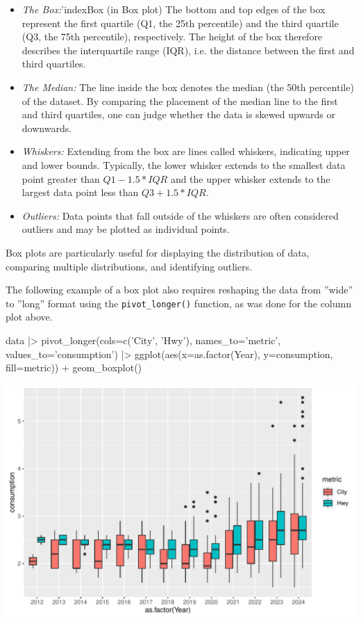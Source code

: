 \begin{itemize}
\item \emph{The Box:}'index{Box (in Box plot)} The bottom and top edges of the box represent the first quartile (Q1, the 25th percentile) and the third quartile (Q3, the 75th percentile), respectively. The height of the box therefore describes the interquartile range (IQR), i.e. the distance between the first and third quartiles.
\item \emph{The Median:} The line inside the box denotes the median (the 50th percentile) of the dataset. By comparing the placement of the median line to the first and third quartiles, one can judge whether the data is skewed upwards or downwards.
\item \emph{Whiskers:} Extending from the box are lines called whiskers, indicating upper and lower bounds. Typically, the lower whisker extends to the smallest data point greater than $Q1 - 1.5 * IQR$ and the upper whisker extends to the largest data point less than $Q3 + 1.5 * IQR$.
\item \emph{Outliers:} Data points that fall outside of the whiskers are often considered outliers and may be plotted as individual points.
\end{itemize}

Box plots are particularly useful for displaying the distribution of data, comparing multiple distributions, and identifying outliers.

The following example of a box plot also requires reshaping the data from ''wide'' to ''long'' format using the \texttt{pivot\_longer()} function, as was done for the column plot above.

\begin{samepage}
\begin{Rcode}
data |>
  pivot_longer(cols=c('City', 'Hwy'), 
               names_to='metric', 
               values_to='consumption') |>
  ggplot(aes(x=as.factor(Year), y=consumption, fill=metric)) +
    geom_boxplot()
\end{Rcode}
\end{samepage}

\begin{center}
  \includegraphics[width=.8\textwidth]{fuel.box.pdf}
\end{center}


